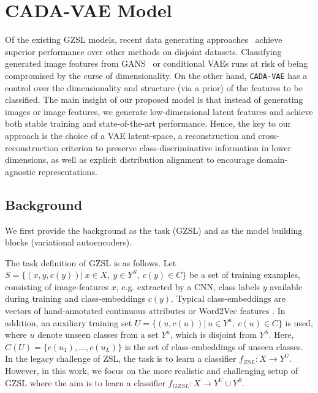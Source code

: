 \documentclass[10pt,twocolumn,letterpaper]{article}
\newcommand{\myparagraph}[1]{\vspace{6pt}\noindent{\bf #1}}
\begin{document}
\section{CADA-VAE Model}
\label{sec:model}
Of the existing GZSL models, recent data generating approaches~\cite{featgen,segzsl,cvae} achieve superior performance over other methods on disjoint datasets.
Classifying generated image features from GANS~\cite{featgen} or conditional VAEs \cite{segzsl,cvae} runs at risk of being compromised by the curse of dimensionality. On the other hand, \texttt{CADA-VAE} has a control over the dimensionality and structure (via a prior) of the features to be classified.
The main insight of our proposed model is that instead of generating images or image features, we generate low-dimensional latent features and achieve both stable training and state-of-the-art performance. Hence, the key to our approach is the choice of a VAE latent-space, a reconstruction and cross-reconstruction criterion to preserve class-discriminative information in lower dimensions, as well as explicit distribution alignment to encourage domain-agnostic representations.

\subsection{Background}

We first provide the background as the task (GZSL) and as the model building blocks (variational autoencoders).

\myparagraph{Generalized Zero-shot Learning.} The task definition of GZSL is as follows.
Let
 $S = \{(x,y,c(y))|\ x \in X,\ y \in Y^S,\ c(y) \in C \} $
be a set of training examples, consisting of image-features $x$, e.g. extracted by a CNN, class labels $y$ available during training and class-embeddings $c(y)$. Typical class-embeddings are vectors of hand-annotated continuous attributes or Word2Vec features \cite{mikolov2013distributed}. In addition, an auxiliary training set
$
U = \{(u,c(u))|\ u \in Y^u,\  c(u) \in C\}
$
is used, where $u$ denote unseen classes from a set $Y^u$, which is disjoint from $Y^S$. Here,  $C(U)=\{c(u_1),...,c(u_L)\}$ is the set of class-embeddings of unseen classes.
In the legacy challenge of ZSL, the task is to learn a classifier $f_{ZSL}: X \rightarrow Y^U$. However, in this work, we focus on the more realistic and challenging setup of GZSL where the aim is to learn a classifier $f_{GZSL}: X \rightarrow Y^U \cup Y^S$.
\end{document}
